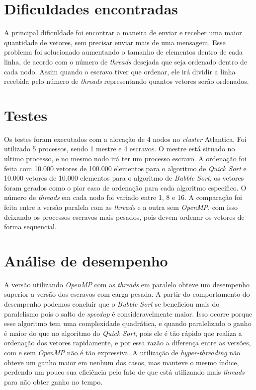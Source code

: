 \documentclass[12pt]{article}
\begin{document}
{\begin{multicols}{2}
\section{Dificuldades encontradas}
A principal dificuldade foi encontrar a maneira de enviar e receber uma maior quantidade de vetores, sem precisar enviar mais de uma mensagem. Esse problema foi solucionado aumentando o tamanho de elementos dentro de cada linha, de acordo com o número de \textit{threads} desejada que seja ordenado dentro de cada nodo. Assim quando o escravo tiver que ordenar, ele irá dividir a linha recebida pelo número de \textit{threads} representando quantos vetores serão ordenados.

\section{Testes}
Os testes foram executados com a alocação de 4 nodos no \textit{cluster} Atlantica. Foi utilizado 5 processos, sendo 1 mestre e 4 escravos. O mestre está situado no ultimo processo, e no mesmo nodo irá ter um processo escravo. A ordenação foi feita com 10.000 vetores de 100.000 elementos para o algoritmo de \textit{Quick Sort} e 10.000 vetores de 10.000 elementos para o algoritmo de \textit{Bubble Sort}, os vetores foram gerados como o pior caso de ordenação para cada algoritmo especifico. O número de \textit{threads} em cada nodo foi variado entre 1, 8 e 16. A comparação foi feita entre a versão paralela com as \textit{threads} e a outra sem \textit{OpenMP}, com isso deixando os processos escravos mais pesados, pois devem ordenar os vetores de forma sequencial.

\section{Análise de desempenho}

A versão utilizando \textit{OpenMP} com as \textit{threads} em paralelo obteve um desempenho superior a versão dos escravos com carga pesada. A partir do comportamento do desempenho podemos concluir que o \textit{Bubble Sort} se beneficiou mais do paralelismo pois o salto de \textit{speedup} é consideravelmente maior. Isso ocorre porque esse algoritmo tem uma complexidade quadrática, e quando paralelizado o ganho é maior do que no algoritmo do \textit{Quick Sort}, pois ele é tão rápido que realiza a ordenação dos vetores rapidamente, e por essa razão a diferença entre as versões, com e sem \textit{OpenMP} não é tão expressiva. A utilização de \textit{hyper-threading} não obteve um ganho maior em nenhum dos casos, mas manteve o mesmo índice, perdendo um pouco sua eficiência pelo fato de que está utilizando mais \textit{threads} para não obter ganho no tempo.


\end{multicols}}
\end{document}
